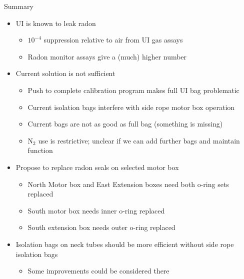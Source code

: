 \documentclass{beamer}
\begin{document}
\begin{frame}{Summary}
	\begin{itemize}
	\item UI is known to leak radon
		\begin{itemize}
		\item $10^{-4}$ suppression relative to air from UI gas assays
		\item Radon monitor assays give a (much) higher number
		\end{itemize}
	\item Current solution is not sufficient
		\begin{itemize}
		\item Push to complete calibration program makes full UI bag problematic
		\item Current isolation bags interfere with side rope motor box operation
		\item Current bags are not as good as full bag (something is missing)
		\item N$_{2}$ use is restrictive; unclear if we can add further bags and maintain function
		\end{itemize}
	\item Propose to replace radon seals on selected motor box
		\begin{itemize}
		\item North Motor box and East Extension boxes need both o-ring sets replaced
		\item South motor box needs inner o-ring replaced
		\item South extension box needs outer o-ring replaced
		\end{itemize}
	\item Isolation bags on neck tubes should be more efficient without side rope isolation bags
		\begin{itemize}
		\item Some improvements could be considered there
		\end{itemize}
	\end{itemize}
\end{frame}
\end{document}
